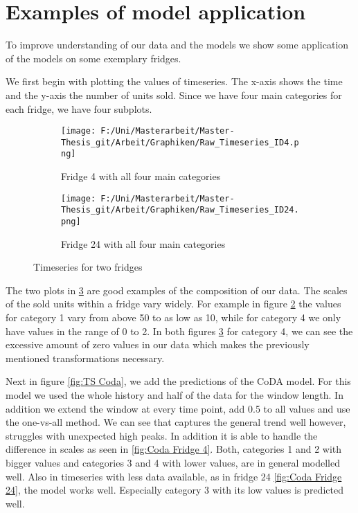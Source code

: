\section{Examples of model application}
\label{sec:Examples of model applicatio}

To improve understanding of our data and the models we show some application of the models on some exemplary fridges. 

We first begin with plotting the values of timeseries. The x-axis shows the time and the y-axis the number of units sold. Since we have four main categories for each fridge, we have four subplots. 

\begin{figure}[htb]
\centering
\begin{subfigure}[b]{0.45\textwidth}
\texttt{[image: F:/Uni/Masterarbeit/Master-Thesis\_git/Arbeit/Graphiken/Raw\_Timeseries\_ID4.png]}
\caption{Fridge 4 with all four main categories}
\label{fig:TS Fridge 4}
\end{subfigure}
\hfill
\begin{subfigure}[b]{0.45\textwidth}
\texttt{[image: F:/Uni/Masterarbeit/Master-Thesis\_git/Arbeit/Graphiken/Raw\_Timeseries\_ID24.png]}
\caption{Fridge 24 with all four main categories}
\label{fig:TS Fridge 24}
\end{subfigure}
\caption{Timeseries for two fridges}
\label{fig:TS raw}
\end{figure}


The two plots in \ref{fig:TS raw} are good examples of the composition of our data. The scales of the sold units within a fridge vary widely. For example in figure \ref{fig:TS Fridge 24} the values for category 1 vary from above 50 to as low as 10, while for category 4 we only have values in the range of 0 to 2. In both figures \ref{fig:TS raw} for category 4, we can see the excessive amount of zero values in our data which makes the previously mentioned transformations necessary. 

Next in figure \ref{fig:TS Coda}, we add the predictions of the CoDA model. For this model we used the whole history and half of the data for the window length. In addition we extend the window at every time point, add 0.5 to all values and use the one-vs-all method. We can see that captures the general trend well however, struggles with unexpected high peaks. In addition it is able to handle the difference in scales as seen in \ref{fig:Coda Fridge 4}. Both, categories 1 and 2 with bigger values and categories 3 and 4 with lower values, are in general modelled well. Also in timeseries with less data available, as in fridge 24 \ref{fig:Coda Fridge 24}, the model works well. Especially category 3 with its low values is predicted well. 

